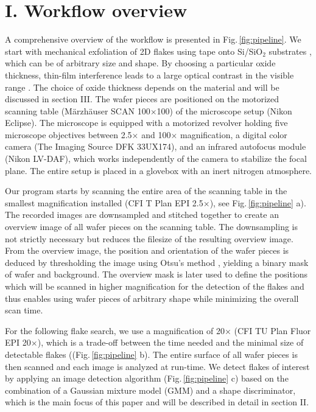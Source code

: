 \documentclass[reprint, prl, superscriptaddress, floatfix]{revtex4-2}
\newcommand{\fig}[1]{Fig.\,\ref{#1}}
\begin{document}
\section{I. Workflow overview}

A comprehensive overview of the workflow is presented in \fig{fig:pipeline}.
We start with mechanical exfoliation of 2D flakes using tape onto Si/SiO$_2$ substrates \cite{Huang2015}, which can be of arbitrary size and shape.
By choosing a particular oxide thickness, thin-film interference leads to a large optical contrast in the visible range \cite{Blake2007, Muller2015}.
The choice of oxide thickness depends on the material and will be discussed in section III.
The wafer pieces are positioned on the motorized scanning table (M\"arzh\"auser SCAN 100$\times$100) of the microscope setup (Nikon Eclipse).
The microscope is equipped with a motorized revolver holding five microscope objectives between 2.5$\times$ and 100$\times$ magnification, a digital color camera (The Imaging Source DFK 33UX174), and an infrared autofocus module (Nikon LV-DAF), which works independently of the camera to stabilize the focal plane.
The entire setup is placed in a glovebox with an inert nitrogen atmosphere. 

Our program starts by scanning the entire area of the scanning table in the smallest magnification installed (CFI T Plan EPI 2.5$\times$), see \fig{fig:pipeline} a). 
The recorded images are downsampled and stitched together to create an overview image of all wafer pieces on the scanning table. 
The downsampling is not strictly necessary but reduces the filesize of the resulting overview image. 
From the overview image, the position and orientation of the wafer pieces is deduced by thresholding the image using Otsu's method \cite{Otsu1979}, yielding a binary mask of wafer and background.
The overview mask is later used to define the positions which will be scanned in higher magnification for the detection of the flakes and thus enables using wafer pieces of arbitrary shape while minimizing the overall scan time.

For the following flake search, we use a magnification of 20$\times$ (CFI TU Plan Fluor EPI 20$\times$), which is a trade-off between the time needed and the minimal size of detectable flakes ((\fig{fig:pipeline} b).
The entire surface of all wafer pieces is then scanned and each image is analyzed at run-time. 
We detect flakes of interest by applying an image detection algorithm  (\fig{fig:pipeline} c) based on the combination of a Gaussian mixture model (GMM) and a shape discriminator, which is the main focus of this paper and will be described in detail in section II. 
\end{document}
